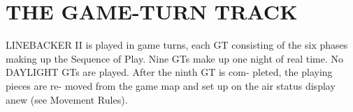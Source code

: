 \section*{THE GAME-TURN TRACK}
LINEBACKER II is played in game
turns, each GT consisting of the six
phases making up the Sequence of
Play. Nine GTs make up one night of
real time. No DAYLIGHT GTs are
played. After the ninth GT is com-
pleted, the playing pieces are re-
moved from the game map and set up
on the air status display anew (see
Movement Rules).

\newpage

